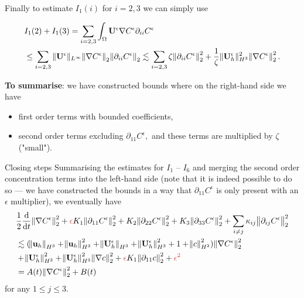 \documentclass{beamer}
\newcommand*\diff{\mathop{}\!\mathrm{d}}
\begin{document}
\begin{frame}

Finally to estimate $I_1(i)$ for $i = 2,3$ we can simply use

\begin{equation} \nonumber
  \begin{split}
    & I_1(2) + I_1(3) = \sum_{i = 2,3} \int_\Omega \mathbf{U}^\epsilon \nabla C^\epsilon \partial_{ii} C^\epsilon \\
    & \leq \sum_{i = 2,3} \| \mathbf{U}^\epsilon \| _{L^\infty} \norm{\nabla C^\epsilon}_2 \norm{\partial_{ii}C^\epsilon}_2 \lesssim \sum_{i = 2,3} \zeta \norm{\partial_{ii} C^\epsilon}_2^2 + \frac{1}{\zeta} \| \mathbf{U}_h^\epsilon \| _ {H^3} ^ 2 \norm{\nabla C^\epsilon}_2^2.
  \end{split}
\end{equation}

\textbf{To summarise}: we have constructed bounds where on the right-hand side we have
\begin{itemize}
\item first order terms with bounded coefficients,
\item second order terms excluding $\partial_{11} C^\epsilon,$ and these terms are multiplied by $\zeta$ ("small").
\end{itemize}

\end{frame}

\begin{frame}{Closing steps}
Summarising the estimates for $I_1$ -- $I_6$ and merging the second order concentration terms into the left-hand side (note that it is indeed possible to do so  --- we have constructed the bounds in a way that $\partial_{11} C^\epsilon$ is only present with an $\epsilon$ multiplier), we eventually have
\changefontsizes{10pt}
%
\begin{equation} \nonumber
  \begin{split}
    & \frac{1}{2} \frac{\diff}{\diff t} \norm{\nabla C^\epsilon}_2^2 + \textcolor{jasper}{\epsilon} K_1 \norm{\partial_{11} C^\epsilon}_2^2 + K_2 \norm{\partial_{22} C^\epsilon}_2^2 + K_3 \norm{\partial_{33} C^\epsilon}_2^2 + \sum_{i \neq j} \kappa_{ij} \norm{\partial_{ij} C^\epsilon}_2^2 \\
    & \lesssim (\norm{\mathbf{u}_h}_{H^3} + \norm{\mathbf{u}_h}_{H^3}^2 + \norm{\mathbf{U}_h^\epsilon}_{H^3} + \norm{\mathbf{U}_h^\epsilon}_{H^3}^2 + 1 + \norm{c}_{H^2}^2) \norm{\nabla C^\epsilon}_2^2 \\
    & + \norm{\mathbf{U}_h^\epsilon}_{H^3}^2 + \norm{\mathbf{U}_h^\epsilon}_{H^3}^2 \norm{\nabla c}_2^2 + \textcolor{jasper}{\epsilon} K_1 \norm{\partial_{11} c}_2^2 + \textcolor{jasper}{\epsilon^2} \\
    & = A(t)  \norm{\nabla C^\epsilon}_2^2 + B(t)
  \end{split}
\end{equation}
%
\changefontsizes{12pt}
for any $1 \leq j \leq 3.$
\end{frame}
\end{document}
